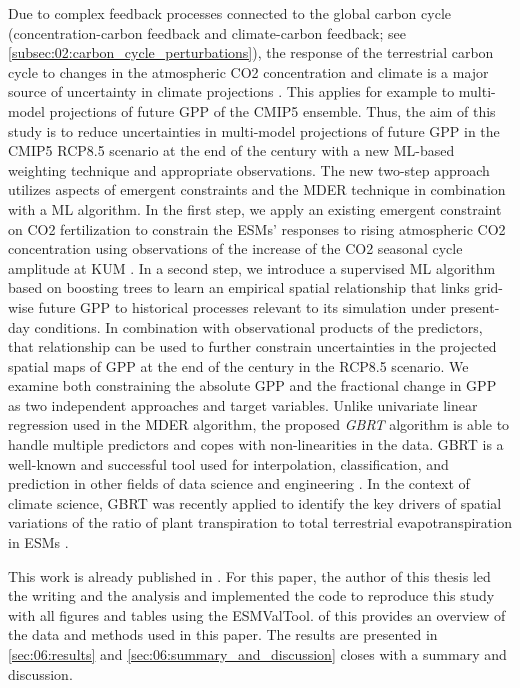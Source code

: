 Due to complex feedback processes connected to the global carbon cycle
(concentration-carbon feedback and climate-carbon feedback; see
\cref{subsec:02:carbon_cycle_perturbations}), the response of the terrestrial
carbon cycle to changes in the atmospheric \ac{CO2} concentration and climate
is a major source of uncertainty in climate projections \autocite{Bodman2013,
  Booth2012, Collins2013}. This applies for example to multi-model projections
of future \ac{GPP} of the \acs{CMIP}5 ensemble. Thus, the aim of this study is
to reduce uncertainties in multi-model projections of future \ac{GPP} in the
\acs{CMIP}5 \acs{RCP}8.5 scenario at the end of the  century with a new
\ac{ML}-based weighting technique and appropriate observations. The new
two-step approach utilizes aspects of emergent constraints and the \ac{MDER}
technique in combination with a \ac{ML} algorithm. In the first step, we apply
an existing emergent constraint on \ac{CO2} fertilization \autocite{Wenzel2016}
to constrain the \acp{ESM}' responses to rising atmospheric \ac{CO2}
concentration using observations of the increase of the \ac{CO2} seasonal cycle
amplitude at \ac{KUM} \autocite{Keeling2005}. In a second step, we introduce a
supervised \ac{ML} algorithm based on boosting trees \autocite{Friedman2001} to
learn an empirical spatial relationship that links grid-wise future \ac{GPP} to
historical processes relevant to its simulation under present-day conditions.
In combination with observational products of the predictors, that relationship
can be used to further constrain uncertainties in the projected spatial maps of
\ac{GPP} at the end of the  century in the \acs{RCP}8.5 scenario. We
examine both constraining the absolute \ac{GPP} and the fractional change in
\ac{GPP} as two independent approaches and target variables. Unlike univariate
linear regression used in the \ac{MDER} algorithm, the proposed
\emph{\ac{GBRT}} algorithm is able to handle multiple predictors and copes with
non-linearities in the data. \Ac{GBRT} is a well-known and successful tool used
for interpolation, classification, and prediction in other fields of data
science and engineering \autocite{Death2007, Elith2008}. In the context of
climate science, \ac{GBRT} was recently applied to identify the key drivers of
spatial variations of the ratio of plant transpiration to total terrestrial
evapotranspiration in \acp{ESM} \autocite{Lian2018}.

This work is already published in \textcite{Schlund2020}. For this paper, the
author of this thesis led the writing and the analysis and implemented the code
to reproduce this study with all figures and tables using the \ac{ESMValTool}.
 of this  provides an
overview of the data and methods used in this paper. The results are presented
in \cref{sec:06:results} and \cref{sec:06:summary_and_discussion} closes with a
summary and discussion.


